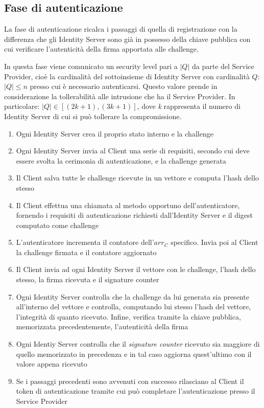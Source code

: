 \subsection{Fase di autenticazione}
\label{autenticazione}

La fase di autenticazione ricalca i passaggi di quella di registrazione con la differenza che gli Identity Server sono già in possesso della chiave pubblica con cui verificare l'autenticità della firma apportata alle challenge. 

In questa fase viene comunicato un security level pari a ${|Q|}$ da parte del Service Provider, cioè la cardinalità del sottoinsieme di Identity Server con cardinalità $Q:$ ${|Q|\leq n}$ presso cui è necessario autenticarsi. Questo valore prende in considerazione la tollerabilità alle intrusione che ha il Service Provider. In particolare: ${|Q| \in [(2k+1), (3k+1)] }$, dove \emph{k} rappresenta il numero di Identity Server di cui si può tollerare la compromissione. 

\begin{enumerate}
	\item Ogni Identity Server crea il proprio stato interno e la challenge
	\item Ogni Identity Server invia al Client una serie di requisiti, secondo cui deve essere svolta la cerimonia di autenticazione, e la challenge generata
	\item Il Client salva tutte le challenge ricevute in un vettore e computa l'hash dello stesso
	\item Il Client effettua una chiamata al metodo opportuno dell'autenticatore, fornendo i requisiti di autenticazione richiesti dall'Identity Server e il digest computato come challenge
	\item L'autenticatore incrementa il contatore dell'${arr_C}$ specifico. Invia poi al Client la challenge firmata e il contatore aggiornato
	\item Il Client invia ad ogni Identity Server il vettore con le challenge, l'hash dello stesso, la firma ricevuta e il signature counter
	\item Ogni Identity Server controlla che la challenge da lui generata sia presente all'interno del vettore e controlla, computando lui stesso l'hash del vettore, l'integrità di quanto ricevuto. Infine, verifica tramite la chiave pubblica, memorizzata precedentemente, l'autenticità della firma
	\item Ogni Identiy Server controlla che il \emph{signature counter} ricevuto sia maggiore di quello memorizzato in precedenza e in tal caso aggiorna quest'ultimo con il valore appena ricevuto
	\item Se i passaggi precedenti sono avvenuti con successo rilasciano al Client il token di autenticazione tramite cui può completare l'autenticazione presso il Service Provider
\end{enumerate}